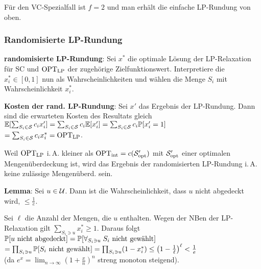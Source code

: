 \linie

Für den VC-Spezialfall ist $f = 2$ und man erhält die einfache LP-Rundung von oben.

\subsubsection{%
    Randomisierte LP-Rundung%
}

\textbf{randomisierte LP-Rundung}:
Sei $x^\ast$ die optimale Lösung der LP-Relaxation für SC und
$\text{OPT}_\text{LP}$ der zugehörige Zielfunktionswert.
Interpretiere die $x_i^\ast \in [0, 1]$ nun als Wahrscheinlichkeiten
und wählen die Menge $S_i$ mit Wahrscheinlichkeit $x_i^\ast$.

\linie

\textbf{Kosten der rand. LP-Rundung}:
Sei $x'$ das Ergebnis der LP-Rundung.
Dann sind die erwarteten Kosten des Resultats gleich
$\mathbb{E}[\sum_{S_i \in \mathcal{S}} c_i x_i'] = \sum_{S_i \in \mathcal{S}} c_i \mathbb{E}[x_i'] =
\sum_{S_i \in \mathcal{S}} c_i \mathbb{P}[x_i' = 1]$\\
$= \sum_{S_i \in \mathcal{S}} c_i x_i^\ast = \text{OPT}_\text{LP}$.

Weil $\text{OPT}_\text{LP}$ i.\,A. kleiner als $\text{OPT}_\text{int} = c(\mathcal{S}'_{\text{opt}})$ mit $\mathcal{S}'_{\text{opt}}$
einer optimalen Mengenüberdeckung
ist, wird das Ergebnis der randomisierten LP-Rundung i.\,A. keine zulässige Mengenüberd. sein.

\textbf{Lemma}:
Sei $u \in \mathcal{U}$.
Dann ist die Wahrscheinlichkeit, dass $u$ nicht abgedeckt wird, $\le \frac{1}{e}$.

\begin{Beweis}
    Sei $\ell$ die Anzahl der Mengen, die $u$ enthalten.
    Wegen der NBen der LP-Relaxation gilt
    $\sum_{S_i \ni u} x_i^\ast \ge 1$.
    Daraus folgt
    $\mathbb{P}[\text{$u$ nicht abgedeckt}]
    = \mathbb{P}[\forall_{S_i \ni u}\; \text{$S_i$ nicht gewählt}]$\\
    $= \prod_{S_i \ni u} \mathbb{P}[\text{$S_i$ nicht gewählt}]
    = \prod_{S_i \ni u} (1 - x_i^\ast)
    \le \left(1 - \frac{1}{\ell}\right)^\ell
    < \frac{1}{e}$\\
    (da $e^x = \lim_{n \to \infty} \left(1 + \frac{x}{n}\right)^n$ streng monoton steigend).
\end{Beweis}

\linie

